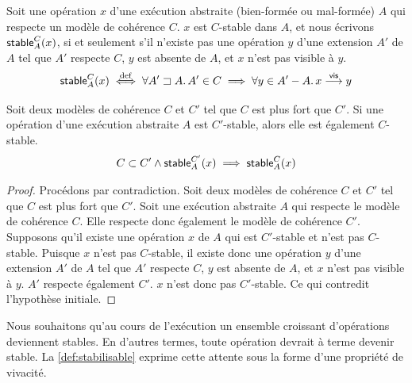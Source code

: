 \begin{definition}\label{def:stable}
Soit une opération $x$ d'une exécution abstraite (bien-formée ou mal-formée) $A$ qui respecte un modèle de cohérence $C$.
$x$ est $C$-stable dans $A$, et nous écrivons $\operatorname{\mathsf{stable}}_A^C(x)$, si et seulement s'il n'existe pas une opération $y$ d'une extension $A'$ de $A$ tel que $A'$ respecte $C$, $y$ est absente de $A$, et $x$ n'est pas visible à $y$.
\begin{equation*}
  \operatorname{\mathsf{stable}}_A^C(x) \overset{\mathrm{def}}{\iff} \forall A' \sqsupset A \ldotp A' \in C \implies \forall y \in A' - A \ldotp x \overset{\mathsf{vis}}{\longrightarrow} y
\end{equation*}
\end{definition}


\begin{theorem}\label{th:stability-hierarchy}
Soit deux modèles de cohérence $C$ et $C'$ tel que $C$ est plus fort que $C'$.
Si une opération d'une exécution abstraite $A$ est $C'$-stable, alors elle est également $C$-stable.
\begin{equation*}
    C \subset C' \land \operatorname{\mathsf{stable}}_A^{C'}(x) \implies \operatorname{\mathsf{stable}}_A^{C}(x)
\end{equation*}
\end{theorem}

\begin{proof}
Procédons par contradiction.
Soit deux modèles de cohérence $C$ et $C'$ tel que $C$ est plus fort que $C'$.
Soit une exécution abstraite $A$ qui respecte le modèle de cohérence $C$.
Elle respecte donc également le modèle de cohérence $C'$.
Supposons qu'il existe une opération $x$ de $A$ qui est $C'$-stable et n'est pas $C$-stable.
Puisque $x$ n'est pas $C$-stable, il existe donc une opération $y$ d'une extension $A'$ de $A$ tel que $A'$ respecte $C$, $y$ est absente de $A$, et $x$ n'est pas visible à $y$.
$A'$ respecte également $C'$.
$x$ n'est donc pas $C'$-stable.
Ce qui contredit l'hypothèse initiale.
\end{proof}

Nous souhaitons qu'au cours de l'exécution un ensemble croissant d'opérations deviennent stables.
En d'autres termes, toute opération devrait à terme devenir stable.
La \autoref{def:stabilisable} exprime cette attente sous la forme d'une propriété de vivacité.

